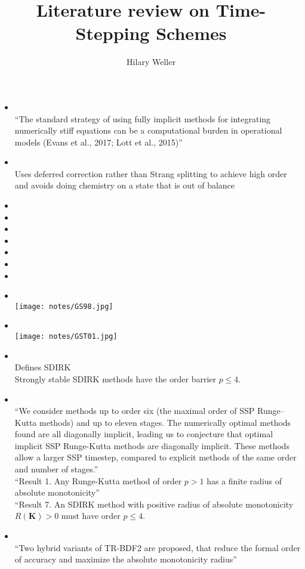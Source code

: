 \documentclass[12pt]{article}
\begin{document}
\title{Literature review on Time-Stepping Schemes}
\author{Hilary Weller}
\maketitle

\begin{itemize}
\item {} \ \\
``The standard strategy of using fully implicit methods for integrating numerically stiff equations can be a computational burden in operational models (Evans et al., 2017; Lott et al., 2015)''
\item {} \ \\
Uses deferred correction rather than Strang splitting to achieve high order and avoids doing chemistry on a state that is out of balance
\item {}
\item {}
\item {}
\item {}
\item {}
\item {}
\item {}
\item {} \ \\ \texttt{[image: notes/GS98.jpg]}
\item {} \ \\ \texttt{[image: notes/GST01.jpg]}
\item {} \ \\ Defines SDIRK \\
Strongly stable SDIRK methods have the order barrier $p\le 4$.
\item {} \ \\
``We consider methods up to order six (the maximal order of SSP Runge–Kutta methods) and up to eleven stages. The
numerically optimal methods found are all diagonally implicit, leading us to conjecture that optimal implicit SSP Runge-Kutta
methods are diagonally implicit. These methods allow a larger SSP timestep, compared to explicit methods of the same order and
number of stages.'' \\
``Result 1. Any Runge-Kutta method of order $p > 1$ has a finite radius of absolute monotonicity'' \\
``Result 7. An SDIRK method with positive radius of absolute monotonicity $R(\mathbf{K}) > 0$ must have order $p \le 4$.

\item {} \ \\ ``Two hybrid variants of TR-BDF2 are proposed, that reduce the formal order of accuracy and maximize the absolute monotonicity radius''
\end{itemize}

\end{document}

